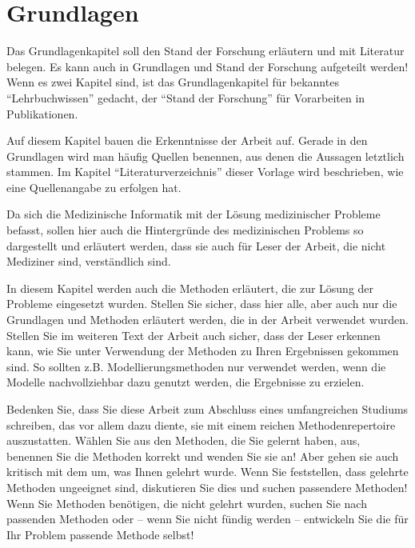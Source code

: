 \chapter{Grundlagen}\label{ch:preliminaries}
\begin{temp}
Das Grundlagenkapitel soll den Stand der Forschung erläutern und mit Literatur belegen.
Es kann auch in Grundlagen und Stand der Forschung aufgeteilt werden!
Wenn es zwei Kapitel sind, ist das Grundlagenkapitel für bekanntes \enquote{Lehrbuchwissen} gedacht, der \enquote{Stand der Forschung} für Vorarbeiten in Publikationen.

Auf diesem Kapitel bauen die Erkenntnisse der Arbeit auf.
Gerade in den Grundlagen wird man häufig Quellen benennen, aus denen die Aussagen letztlich stammen.
Im Kapitel \enquote{Literaturverzeichnis} dieser Vorlage wird beschrieben, wie eine Quellenangabe zu erfolgen hat.

Da sich die Medizinische Informatik mit der Lösung medizinischer Probleme befasst, sollen hier auch die Hintergründe des medizinischen Problems so dargestellt und erläutert werden, dass sie auch für Leser der Arbeit, die nicht Mediziner sind, verständlich sind.

In diesem Kapitel werden auch die Methoden erläutert, die zur Lösung der Probleme eingesetzt wurden.
Stellen Sie sicher, dass hier alle, aber auch nur die Grundlagen und Methoden erläutert werden, die in der Arbeit verwendet wurden.
Stellen Sie im weiteren Text der Arbeit auch sicher, dass der Leser erkennen kann, wie Sie unter Verwendung der Methoden zu Ihren Ergebnissen gekommen sind.
So sollten z.B. Modellierungsmethoden nur verwendet werden, wenn die Modelle nachvollziehbar dazu genutzt werden, die Ergebnisse zu erzielen.

Bedenken Sie, dass Sie diese Arbeit zum Abschluss eines umfangreichen Studiums schreiben, das vor allem dazu diente, sie mit einem reichen Methodenrepertoire auszustatten.
Wählen Sie aus den Methoden, die Sie gelernt haben, aus, benennen Sie die Methoden korrekt und wenden Sie sie an! Aber gehen sie auch kritisch mit dem um, was Ihnen gelehrt wurde.
Wenn Sie feststellen, dass gelehrte Methoden ungeeignet sind, diskutieren Sie dies und suchen passendere Methoden! Wenn Sie Methoden benötigen, die nicht gelehrt wurden, suchen Sie nach passenden Methoden oder -- wenn Sie nicht fündig werden -- entwickeln Sie die für Ihr Problem passende Methode selbst!


\end{temp}
